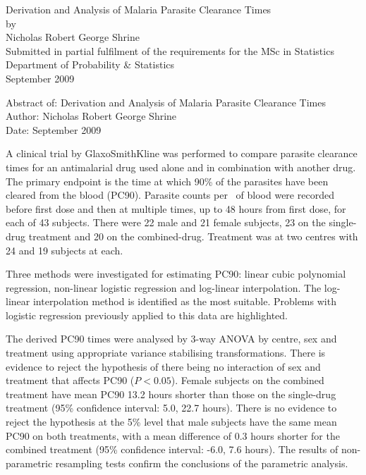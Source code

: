 \documentclass[a4paper,12pt,openright,twoside]{book}
\begin{document}
\begin{titlepage}
\vspace*{\fill}
\begin{center}
{\huge Derivation and Analysis of Malaria Parasite Clearance Times}\\[1cm]
by\\[1cm]
{\large Nicholas Robert George Shrine}\\[4cm]
Submitted in partial fulfilment of the requirements for the MSc in Statistics\\
Department of Probability \& Statistics\\[2cm]
September 2009
\end{center}
\vspace*{\fill}
\end{titlepage}
\clearpage{\pagestyle{empty}\cleardoublepage}
\frontmatter
Abstract of: Derivation and Analysis of Malaria Parasite Clearance Times\\[0.5cm]
Author: Nicholas Robert George Shrine\\[0.5cm]
Date: September 2009\\[0.1cm]
\setlength{\parindent}{0.4in}
\setlength{\parskip}{0.0in}

A clinical trial by GlaxoSmithKline was performed to compare parasite clearance times for an antimalarial drug used alone and in combination with another drug. The primary endpoint is the time at which 90\% of the parasites have been cleared from the blood (PC90). Parasite counts per \micro\liter\ of blood were recorded before first dose and then at multiple times, up to 48 hours from first dose, for each of 43 subjects. There were 22 male and 21 female subjects, 23 on the single-drug treatment and 20 on the combined-drug. Treatment was at two centres with 24 and 19 subjects at each. 

Three methods were investigated for estimating PC90: linear cubic polynomial regression, non-linear logistic regression and log-linear interpolation. The log-linear interpolation method is identified as the most suitable. Problems with logistic regression previously applied to this data are highlighted.

The derived PC90 times were analysed by 3-way ANOVA by centre, sex and treatment using appropriate variance stabilising transformations. There is evidence to reject the hypothesis of there being no interaction of sex and treatment that affects PC90 ($P<0.05$). Female subjects on the combined treatment have mean PC90 13.2 hours shorter than those on the single-drug treatment (95\% confidence interval: 5.0, 22.7 hours). There is no evidence to reject the hypothesis at the 5\% level that male subjects have the same mean PC90 on both treatments, with a mean difference of 0.3 hours shorter for the combined treatment (95\% confidence interval: -6.0, 7.6 hours). The results of non-parametric resampling tests confirm the conclusions of the parametric analysis.
\end{document}
